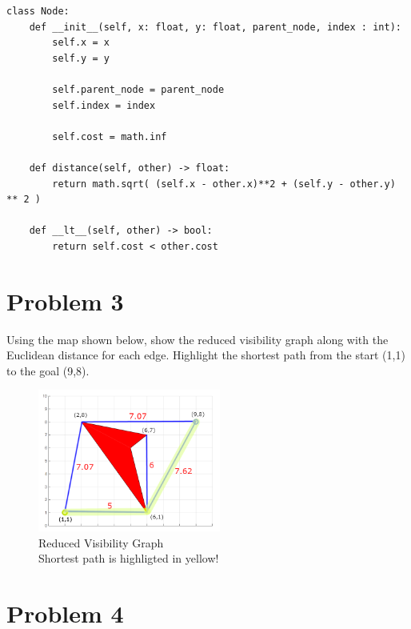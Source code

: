 \documentclass{article}
\begin{document}
\begin{verbatim}
class Node:
    def __init__(self, x: float, y: float, parent_node, index : int):
        self.x = x
        self.y = y

        self.parent_node = parent_node
        self.index = index

        self.cost = math.inf
    
    def distance(self, other) -> float:
        return math.sqrt( (self.x - other.x)**2 + (self.y - other.y) ** 2 )
    
    def __lt__(self, other) -> bool:
        return self.cost < other.cost
\end{verbatim}

\section*{Problem 3}
 
Using the map shown below, show the reduced visibility graph along with the Euclidean distance for 
each edge. Highlight the shortest path from the start (1,1) to the goal (9,8). 


\begin{figure}[h]
    \centering
    \includegraphics[width=6cm]{question3.png}
    \caption*{Reduced Visibility Graph\\Shortest path is highligted in yellow!}
\end{figure}


\section*{Problem 4}
\end{document}
